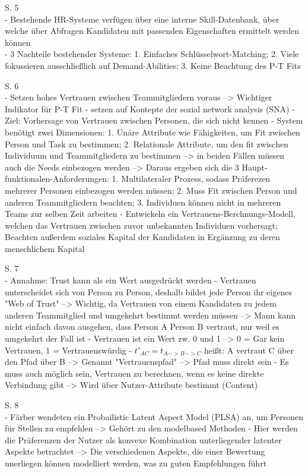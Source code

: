 S. 5\\
- Bestehende HR-Systeme verfügen über eine interne Skill-Datenbank, über welche über Abfragen Kandidaten mit passenden Eigenschaften ermittelt werden können\\
- 3 Nachteile bestehender Systeme: 1. Einfaches Schlüsselwort-Matching; 2. Viele fokussieren ausschließlich auf Demand-Abilities; 3. Keine Beachtung des P-T Fits

S. 6\\
- Setzen hohes Vertrauen zwischen Teammitgliedern voraus --> Wichtiger Indikator für P-T Fit
- setzen auf Kontepte der sozial network analysis (SNA)
- Ziel: Vorhersage von Vertrauen zwischen Personen, die sich nicht kennen
- System benötigt zwei Dimensionen: 1. Unäre Attribute wie Fähigkeiten, um Fit zwischen Person und Task zu bestimmen; 2. Relationale Attribute, um den fit zwischen Individuum und Teammitgliedern zu bestimmen --> in beiden Fällen müssen auch die Needs einbezogen werden --> Daraus ergeben sich die 3 Haupt-funktionalen-Anforderungen: 1. Multilateraler Prozess, sodass Präferezen mehrerer Personen einbezogen werden müssen; 2. Muss Fit zwischen Person und anderen Teammitgliedern beachten; 3. Individuen können nicht in mehreren Teams zur selben Zeit arbeiten
- Entwickeln ein Vertrauens-Berchnungs-Modell, welchen das Vertrauen zwischen zuvor unbekannten Individuen vorhersagt; Beachten außerdem soziales Kapital der Kandidaten in Ergänzung zu deren menschlichem Kapital

S. 7\\
- Annahme: Trust kann als ein Wert ausgedrückt werden
- Vertrauen unterscheidet sich von Person zu Person, deshalb bildet jede Person ihr eigenes "Web of Trust" --> Wichtig, da Vertrauen von einem Kandidaten zu jedem anderen Teammitglied und umgekehrt bestimmt werden müssen --> Mann kann nicht einfach davon ausgehen, dass Person A Person B vertraut, nur weil es umgekehrt der Fall ist
- Vertrauen ist ein Wert zw. 0 und 1 --> 0 = Gar kein Vertrauen, 1 = Vertrauenswürdig
- $t'_{AC} = t_{A->B->C}$ heißt: A vertraut C über den Pfad über B --> Genannt "Vertrauenspfad" --> Pfad muss direkt sein
- Es muss auch möglich sein, Vertrauen zu berechnen, wenn es keine direkte Verbindung gibt --> Wird über Nutzer-Attribute bestimmt (Content)

S. 8\\
- Färber wendeten ein Probailistic Latent Aspect Model (PLSA) an, um Personen für Stellen zu empfehlen --> Gehört zu den modelbased Methoden
- Hier werden die Präferenzen der Nutzer als konvexe Kombination unterliegender latenter Aspekte betrachtet --> Die verschiedenen Aspekte, die einer Bewertung unerliegen können modelliert werden, was zu guten Empfehlungen führt

